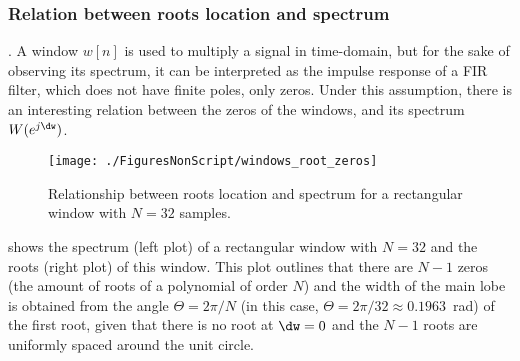 






\subsubsection{Relation between roots location and spectrum}. 
A window $w[n]$ is used to multiply a signal in time-domain, but for the sake of observing its spectrum, it can be interpreted as the impulse response of a FIR filter, which does not have finite poles, only zeros. 
Under this assumption, there is an interesting relation between the zeros of the windows, and its spectrum $W(e^{j \dw})$. 

\begin{figure}[htbp]
\centering
\texttt{[image: ./FiguresNonScript/windows\_root\_zeros]}
\caption{Relationship between roots location and spectrum for a rectangular window with $N=32$ samples.\label{fig:windows_root_zeros}}
\end{figure}

 shows the spectrum (left plot) of a rectangular window with $N=32$ and the roots (right plot) of this window. This plot outlines that there are $N-1$ zeros (the amount of roots of a polynomial of order $N$) and the width of the main lobe is obtained from the angle $\Theta = 2 \pi/N$ (in this case,  $\Theta = 2 \pi/32 \approx 0.1963$~rad) of the first root, given that there is no root at $\dw=0$ and the $N-1$ roots are uniformly spaced around the unit circle.

